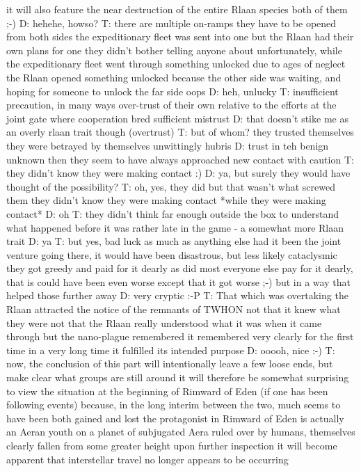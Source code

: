 it will also feature the near destruction of the entire Rlaan species
both of them ;-)
D: hehehe, howso?
T: there are multiple on-ramps
they have to be opened from both sides
the expeditionary fleet was sent into one
but the Rlaan had their own plans for one they didn't bother telling anyone about
unfortunately, while the expeditionary fleet went through something unlocked due to ages of neglect
the Rlaan opened something unlocked because the other side was waiting, and hoping for someone to unlock the far side
oops
D: heh, unlucky
T: insufficient precaution, in many ways
over-trust of their own
relative to the efforts at the joint gate
where cooperation bred sufficient mistrust
D: that doesn't stike me as an overly rlaan trait though (overtrust)
T: but of whom?
they trusted themselves
they were betrayed by themselves
unwittingly
hubris
D: trust in teh benign unknown then
they seem to have always approached new contact with caution
T: they didn't know they were making contact :)
D: ya, but surely they would have thought of the possibility?
T: oh, yes, they did
but that wasn't what screwed them
they didn't know they were making contact *while they were making contact*
D: oh
T: they didn't think far enough outside the box to understand what happened before it was rather late in the game - a somewhat more Rlaan trait
D: ya
T: but yes, bad luck as much as anything else
had it been the joint venture going there, it would have been disastrous, but less likely cataclysmic
they got greedy and paid for it dearly
as did most everyone else
pay for it dearly, that is
could have been even worse
except that it got worse ;-)
but in a way that helped those further away
D: very cryptic :-P
T: That which was overtaking the Rlaan attracted the notice of the remnants of TWHON
not that it knew what they were
not that the Rlaan really understood what it was when it came through
but the nano-plague remembered
it remembered very clearly
for the first time in a very long time
it fulfilled its intended purpose
D: ooooh, nice :-)
T: now, the conclusion of this part will intentionally leave a few loose ends, but make clear what groups are still around
it will therefore be somewhat surprising to view the situation at the beginning of Rimward of Eden
(if one has been following events)
because, in the long interim between the two, much seems to have been both gained and lost
the protagonist in Rimward of Eden is actually an Aeran youth
on a planet of subjugated Aera ruled over by humans, themselves clearly fallen from some greater height 
upon further inspection it will become apparent that interstellar travel no longer appears to be occurring
